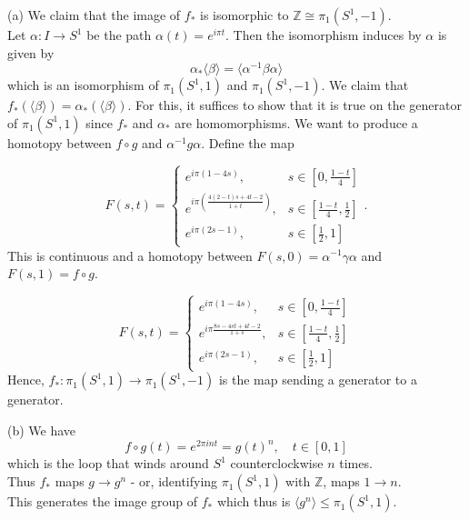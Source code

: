 \documentclass[a4paper]{article}
\begin{document}
 (a)
We claim that the image of  $f_*$ is isomorphic to $\mathbb{Z} 
\cong \pi_1 (S^{1}, -1)$.\\
\linebreak
Let $\alpha  \colon I \to S^{1}$ be the path
$\alpha(t) = e^{i \pi t}$. Then the isomorphism induces by $\alpha$ is given by
\[
\alpha_* \langle \beta \rangle 
= \langle \alpha^{-1} \beta \alpha \rangle 
\] 
which is an isomorphism of $\pi_1 (S^{1}, 1)$ and
$\pi_1 \left( S^{1},-1 \right) $. We claim that
$f_* \left( \langle \beta \rangle  \right) 
= \alpha_* \left( \langle \beta \rangle  \right) $. For this, it suffices to
show that it is true on the generator of $\pi_1 \left( S^{1},1 \right) $ since
$f_*$ and $\alpha_*$ are homomorphisms. 
We want to produce a homotopy between
$f \circ g$ and $\alpha^{-1} g \alpha$. Define
the map


\[
F(s,t)
= 
\begin{cases}
    e^{i \pi (1-4s)}, & s \in  \left[ 0, \frac{1-t}{4} \right] \\
    e^{i \pi \left( \frac{4 (2-t)s + 4t - 2}{1+t} \right) }, & s \in \left[
    \frac{1-t}{4} , \frac{1}{2} \right] \\
        e^{i \pi (2s-1)}, & s \in \left[ \frac{1}{2},1 \right]
\end{cases}.
\] 
This is continuous and a homotopy between
$F(s,0) = \alpha^{-1} \gamma \alpha$ and
$F(s,1) = f \circ g$.





\[
F(s,t) = 
\begin{cases}
    e^{ i \pi (1-4s)}, & s \in \left[ 0, \frac{1-t}{4} \right] \\
    e^{i \pi \frac{8s - 4st + 4t - 2}{1+s}}, & s \in \left[ \frac{1-t}{4},
    \frac{1}{2} \right] \\
        e^{i \pi (2s-1)}, & s \in \left[ \frac{1}{2},1 \right] 
\end{cases}
\] 
Hence, $f_*  \colon \pi_1 \left( S^{1}, 1 \right) 
\to \pi_1 \left( S^{1},-1 \right) $ is the map sending a generator to
a generator.\\
\linebreak

 













(b) We have
\[
f \circ g (t) = 
e^{2 \pi i n t} = g(t)^{n}, \quad t \in \left[ 0,1 \right] 
\] 
which is the loop that winds around $S^{1}$ counterclockwise 
$n$ times.\\
Thus $f_*$ maps $g \to g^{n}$ - or, identifying $\pi_1 \left( S^{1},1 \right)
$ with $\mathbb{Z}$, maps $1 \to n$.\\
This generates the image group of $f_*$ which thus is
$\langle g^{n} \rangle 
\le \pi_1 \left( S^{1},1 \right) $.
\end{document}
